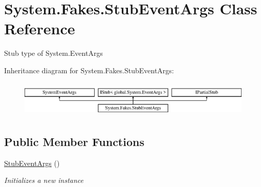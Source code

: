 \hypertarget{class_system_1_1_fakes_1_1_stub_event_args}{\section{System.\-Fakes.\-Stub\-Event\-Args Class Reference}
\label{class_system_1_1_fakes_1_1_stub_event_args}
}


Stub type of System.\-Event\-Args 


Inheritance diagram for System.\-Fakes.\-Stub\-Event\-Args\-:\begin{figure}[H]
\begin{center}
\leavevmode
\includegraphics[height=1.752739cm]{class_system_1_1_fakes_1_1_stub_event_args}
\end{center}
\end{figure}
\subsection*{Public Member Functions}
\begin{DoxyCompactItemize}
\item 
\hyperlink{class_system_1_1_fakes_1_1_stub_event_args_a3dabc1a4e3c6c0c08f08a4d595df43a0}{Stub\-Event\-Args} ()
\begin{DoxyCompactList}\small\item\em Initializes a new instance\end{DoxyCompactList}\end{DoxyCompactItemize}
